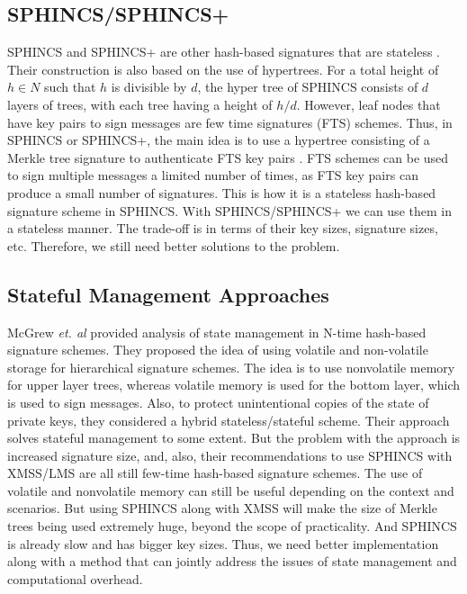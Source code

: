 \subsection{SPHINCS/SPHINCS+}
SPHINCS and SPHINCS+ are other hash-based signatures that are stateless \cite{bernsteinSPHINCSPracticalStateless2015}.
Their construction is also based on the use of hypertrees.
For a total height of $h \in N$ such that $h$ is divisible by $d$, the hyper tree of SPHINCS
consists of $d$ layers of trees, with each tree having a height of $h/d$.
However, leaf nodes that have key pairs to sign messages are few time signatures (FTS) schemes.
Thus, in SPHINCS or SPHINCS+, the main idea is to use a hypertree consisting of a Merkle tree signature to authenticate FTS key pairs \cite{bernstein2019sphincs+}.
FTS schemes can be used to sign multiple messages a limited number of times, as FTS key pairs can produce a small number of signatures.
This is how it is a stateless hash-based signature scheme in SPHINCS.
With SPHINCS/SPHINCS+ we can use them in a stateless manner.
The trade-off is in terms of their key sizes, signature sizes, etc.
Therefore, we still need better solutions to the problem.

\subsection{Stateful Management Approaches}
 McGrew \textit{et. al} \cite{mcgrewStateManagementHashBased2016} provided analysis of state management in N-time hash-based signature schemes.
They proposed the idea of using volatile and non-volatile storage for hierarchical signature schemes.
The idea is to use nonvolatile memory for upper layer trees, whereas
volatile memory is used for the bottom layer, which is used to sign messages.
Also, to protect unintentional copies of the state of private keys, 
they considered a hybrid stateless/stateful scheme.
Their approach solves stateful management to some extent.
But the problem with the approach is increased signature size, and, also,
their recommendations to use SPHINCS with XMSS/LMS are all still few-time hash-based signature schemes.
The use of volatile and nonvolatile memory can still be useful depending on the context and scenarios.
But using SPHINCS along with XMSS will make the size of Merkle trees being used extremely huge,
beyond the scope of practicality.
And SPHINCS is already slow and has bigger key sizes.
Thus, we need better implementation along with a method that can jointly address the issues of state management and computational overhead.

